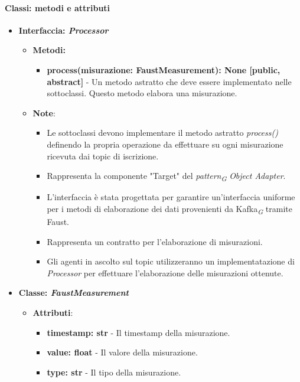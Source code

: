 \paragraph*{Classi: metodi e attributi}
\begin{itemize}
    \item{\textbf{Interfaccia: \textit{Processor}}}
    \begin{itemize}
    \item\textbf{Metodi: }
    \begin{itemize}
        \item \textbf{process(misurazione: FaustMeasurement): None [public, abstract]} - Un metodo astratto che deve essere implementato nelle sottoclassi. Questo metodo elabora una misurazione.
    \end{itemize}
    \item\textbf{Note}:
        \begin{itemize}
            \item  Le sottoclassi devono implementare il metodo astratto \textit{process()} definendo la propria operazione da effettuare su ogni misurazione ricevuta dai topic di iscrizione.
            \item Rappresenta la componente "Target" del \textit{pattern}\textsubscript{\textit{G}} \textit{Object Adapter}.
            \item L'interfaccia è stata progettata per garantire un'interfaccia uniforme per i metodi di elaborazione dei dati provenienti da Kafka\textsubscript{\textit{G}} tramite Faust.
            \item Rappresenta un contratto per l'elaborazione di misurazioni.
            \item Gli agenti in ascolto sul topic utilizzeranno un implementatazione di \textit{Processor} per effettuare l'elaborazione delle misurazioni ottenute.
        \end{itemize}
    \end{itemize}
    \item{\textbf{Classe: \textit{FaustMeasurement}}}
    \begin{itemize}
    \item\textbf{Attributi}:
        \begin{itemize}
        \item \textbf{timestamp: str} - Il timestamp della misurazione.
        \item \textbf{value: float} - Il valore della misurazione.
        \item \textbf{type: str} - Il tipo della misurazione.

\end{itemize}
\end{itemize}
\end{itemize}
